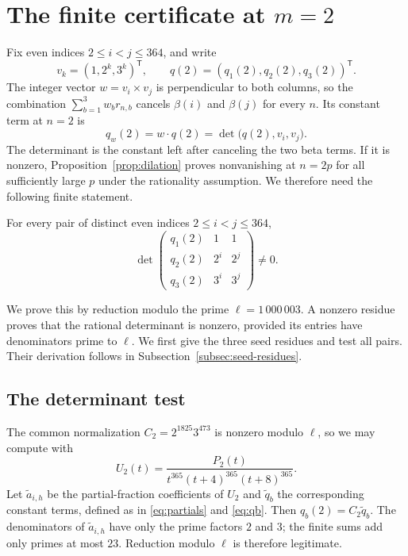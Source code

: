 \section{The finite certificate at \texorpdfstring{$m=2$}{m=2}}
\label{sec:certificate}

Fix even indices $2\leq i<j\leq364$, and write
\[
 v_k=(1,2^k,3^k)^{\mathsf T},\qquad
 q(2)=(q_1(2),q_2(2),q_3(2))^{\mathsf T}.
\]
The integer vector $w=v_i\times v_j$ is perpendicular to both columns,
so the combination $\sum_{b=1}^3w_br_{n,b}$ cancels $\beta(i)$ and
$\beta(j)$ for every $n$. Its constant term at $n=2$ is
\[
 q_w(2)=w\cdot q(2)=\det\bigl(q(2),v_i,v_j\bigr).
\]
The determinant is the constant left after canceling the two beta
terms. If it is nonzero, Proposition~\ref{prop:dilation} proves
nonvanishing at $n=2p$ for all sufficiently large $p$ under the
rationality assumption. We therefore need the following finite statement.

\begin{lemma}\label{lem:seed}
For every pair of distinct even indices $2\leq i<j\leq364$,
\begin{equation}\label{eq:determinant}
 \det\begin{pmatrix}
 q_1(2)&1&1\\q_2(2)&2^i&2^j\\q_3(2)&3^i&3^j
 \end{pmatrix}\ne0.
\end{equation}
\end{lemma}

We prove this by reduction modulo the prime $\ell=1\,000\,003$.
A nonzero residue proves that the rational determinant is nonzero,
provided its entries have denominators prime to $\ell$. We first give
the three seed residues and test all pairs. Their derivation follows in
Subsection~\ref{subsec:seed-residues}.

\subsection{The determinant test}

The common normalization $C_2=2^{1825}3^{473}$ is nonzero modulo $\ell$,
so we may compute with
\[
 U_2(t)=\frac{P_2(t)}{t^{365}(t+4)^{365}(t+8)^{365}}.
\]
Let $\widetilde a_{i,h}$ be the partial-fraction coefficients of $U_2$
and $\widetilde q_b$ the corresponding constant terms, defined as in
\eqref{eq:partials} and \eqref{eq:qb}. Then $q_b(2)=C_2\widetilde q_b$.
The denominators of $\widetilde a_{i,h}$ have only the prime factors
$2$ and $3$; the finite sums add only primes at most $23$.
Reduction modulo $\ell$ is therefore legitimate.

